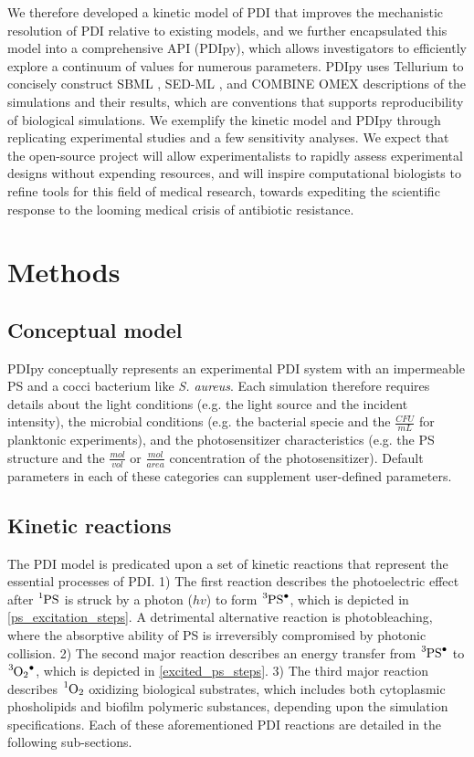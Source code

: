 We therefore developed a kinetic model of PDI that improves the mechanistic resolution of PDI relative to existing models, and we further encapsulated this model into a comprehensive API (PDIpy), which allows investigators to efficiently explore a continuum of values for numerous parameters. PDIpy uses Tellurium \cite{Choi2018Tellurium:Biology} to concisely construct SBML \cite{Keating2020Models}, SED-ML \cite{Waltemath2011ReproducibleLanguage}, and COMBINE OMEX \cite{Bergmann2014COMBINEProject} descriptions of the simulations and their results, which are conventions that supports reproducibility of biological simulations. We exemplify the kinetic model and PDIpy through replicating experimental studies and a few sensitivity analyses. We expect that the open-source project will allow experimentalists to rapidly assess experimental designs without expending resources, and will inspire computational biologists to refine tools for this field of medical research, towards expediting the scientific response to the looming medical crisis of antibiotic resistance. 

\section*{Methods}
\subsection*{Conceptual model}
PDIpy conceptually represents an experimental PDI system with an impermeable PS and a cocci bacterium like \textit{S. aureus}. Each simulation therefore requires details about the light conditions (e.g. the light source and the incident intensity), the microbial conditions (e.g. the bacterial specie and the $\frac{CFU}{mL}$ for planktonic experiments), and the photosensitizer characteristics (e.g. the PS structure and the $\frac{mol}{vol}$ or $\frac{mol}{area}$ concentration of the photosensitizer). Default parameters in each of these categories can supplement user-defined parameters. 

\subsection*{Kinetic reactions}
The PDI model is predicated upon a set of kinetic reactions that represent the essential processes of PDI. 1) The first reaction describes the photoelectric effect \cite{Wheaton2009PhotoelectricEffect} after $\ce{^1PS}$ is struck by a photon ($hv$) to form $\ce{^3PS^.}$, which is depicted in \cref{ps_excitation_steps}. A detrimental alternative reaction is photobleaching, where the absorptive ability of PS is irreversibly compromised by photonic collision. 2) The second major reaction describes an energy transfer from $\ce{^3PS^.}$ to $\ce{^3O2^.}$, which is depicted in \cref{excited_ps_steps}. 3) The third major reaction describes $\ce{^1O2}$ oxidizing biological substrates, which includes both cytoplasmic phosholipids and biofilm polymeric substances, depending upon the simulation specifications. Each of these aforementioned PDI reactions are detailed in the following sub-sections.

